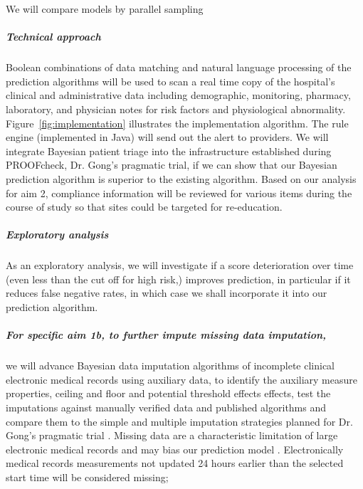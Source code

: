 \documentclass[11pt,notitlepage]{article}
\begin{document}
We will compare models by parallel sampling \cite{Congdon_modelcomparison_2005}

\subparagraph*{Technical approach}
Boolean combinations of data matching and natural language processing of the prediction algorithms will be used to scan a real time copy of the hospital's clinical and administrative data including demographic, monitoring, pharmacy, laboratory, and physician notes for risk factors and physiological abnormality. Figure~\ref{fig:implementation} illustrates the implementation algorithm. The rule engine (implemented in Java) will send out the alert to providers.
We will integrate Bayesian patient triage into the infrastructure established during PROOFcheck, Dr. Gong's pragmatic trial, if we can show that our Bayesian prediction algorithm is superior to the existing algorithm. Based on our analysis for aim 2, compliance information will be reviewed for various items during the course of study so that sites could be targeted for re-education.

\subparagraph{Exploratory analysis}
As an exploratory analysis, we will investigate if a score deterioration over time (even less than the cut off for high risk,) improves prediction, in particular if it reduces false negative rates, in which case we shall incorporate it into our prediction algorithm.

\subparagraph{For specific aim 1b, to further impute missing data imputation,}
we will advance Bayesian data imputation algorithms of incomplete clinical electronic medical records using auxiliary data, to identify the auxiliary measure properties, ceiling and floor and potential threshold effects effects, test the imputations against manually verified data and published algorithms and compare them to the simple and multiple imputation strategies planned for Dr. Gong's pragmatic trial \cite{Huntington_16311133,Sloan_15027501}. Missing data are a characteristic limitation of large electronic medical records and may bias our prediction model \cite{Dean_19279318}. Electronically medical records measurements not updated 24 hours earlier than the selected start time will be considered missing; 
\end{document}
